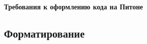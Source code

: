 \documentclass[11pt,a4paper,oneside]{article}
\begin{document}
\renewcommand{\t}[1]{\mbox{\texttt{#1}}}
\newcommand{\s}[1]{\mbox{``\t{#1}''}}
\newcommand{\eps}{\varepsilon}
\renewcommand{\phi}{\varphi}
\newcommand{\plainhat}{{\char 94}}

\newcommand{\Z}{\mathbb{Z}}
\newcommand{\w}[1]{``\t{#1}''}




\begin{LARGE} \textbf{Требования к оформлению кода на Питоне} \end{LARGE}
\newline
\subsection*{Форматирование}
\end{document}
